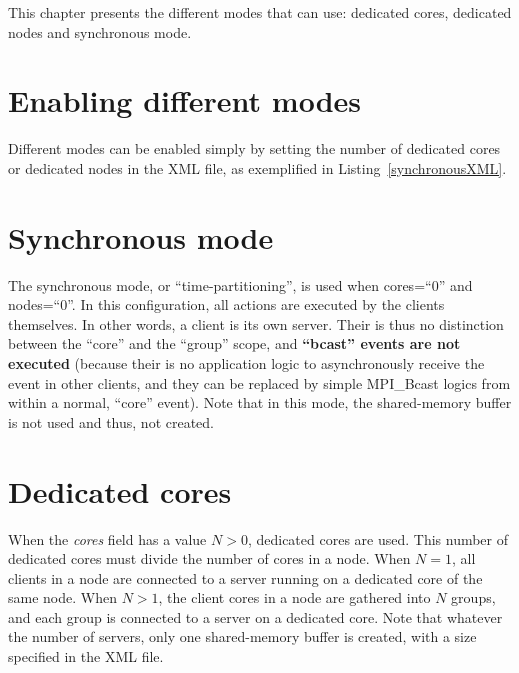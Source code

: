 This chapter presents the different modes that \Damaris{} can use: dedicated cores, dedicated nodes
and synchronous mode.

\section{Enabling different modes}

Different modes can be enabled simply by setting the number of dedicated cores or dedicated nodes
in the XML file, as exemplified in Listing~\ref{synchronousXML}.

\noindent\begin{minipage}{\textwidth}
\vspace{0.5cm}

\end{minipage}

\section{Synchronous mode}

The synchronous mode, or ``time-partitioning'', is used when cores=``0'' and nodes=``0''. In this configuration,
all actions are executed by the clients themselves. In other words, a client is its own server.
Their is thus no distinction between the ``core'' and the ``group'' scope, and \textbf{``bcast'' events
are not executed} (because their is no application logic to asynchronously receive the event
in other clients, and they can be replaced by simple MPI\_Bcast logics from within a normal, ``core'' event).
Note that in this mode, the shared-memory buffer is not used and thus, not created.

\section{Dedicated cores}

When the \emph{cores} field has a value $N > 0$, dedicated cores are used. This number of dedicated
cores must divide the number of cores in a node. When $N=1$, all clients in a node are connected to
a server running on a dedicated core of the same node. When $N > 1$, the client cores in a node
are gathered into $N$ groups, and each group is connected to a server on a dedicated core.
Note that whatever the number of servers, only one shared-memory buffer is created, with a size
specified in the XML file.

